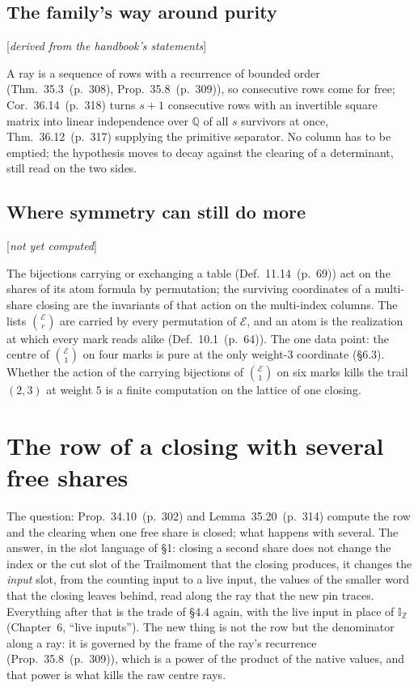 \documentclass[11pt]{article}
\newcommand{\cE}{\mathcal E}
\newcommand{\IZ}{\mathbb I_{\mathbb Z}}
\newcommand{\status}[1]{\hfill{\small[\textit{#1}]}}
\newcommand{\hb}[2]{#1~(p.~#2)}   %
\theoremstyle{plain}
\theoremstyle{remark}
\begin{document}
\subsection{The family's way around purity}\status{derived from the handbook's statements}

A ray is a sequence of rows with a recurrence of bounded order (Thm.~\hb{35.3}{308}, Prop.~\hb{35.8}{309}), so consecutive rows come for free; Cor.~\hb{36.14}{318} turns $s+1$ consecutive rows with an invertible square matrix into linear independence over $\mathbb Q$ of all $s$ survivors at once, Thm.~\hb{36.12}{317} supplying the primitive separator. No column has to be emptied; the hypothesis moves to decay against the clearing of a determinant, still read on the two sides.

\subsection{Where symmetry can still do more}\status{not yet computed}

The bijections carrying or exchanging a table (Def.~\hb{11.14}{69}) act on the shares of its atom formula by permutation; the surviving coordinates of a multi-share closing are the invariants of that action on the multi-index columns. The lists $\binom{\cE}r$ are carried by every permutation of $\cE$, and an atom is the realization at which every mark reads alike (Def.~\hb{10.1}{64}). The one data point: the centre of $\binom{\cE}1$ on four marks is pure at the only weight-$3$ coordinate (\S6.3). Whether the action of the carrying bijections of $\binom{\cE}1$ on six marks kills the trail $(2,3)$ at weight $5$ is a finite computation on the lattice of one closing.

\section{The row of a closing with several free shares}

The question: Prop.~\hb{34.10}{302} and Lemma~\hb{35.20}{314} compute the row and the clearing when one free share is closed; what happens with several. The answer, in the slot language of \S1: closing a second share does not change the index or the cut slot of the Trailmoment that the closing produces, it changes the \emph{input} slot, from the counting input to a live input, the values of the smaller word that the closing leaves behind, read along the ray that the new pin traces. Everything after that is the trade of \S4.4 again, with the live input in place of $\IZ$ (Chapter~6, ``live inputs''). The new thing is not the row but the denominator along a ray: it is governed by the frame of the ray's recurrence (Prop.~\hb{35.8}{309}), which is a power of the product of the native values, and that power is what kills the raw centre rays.
\end{document}
